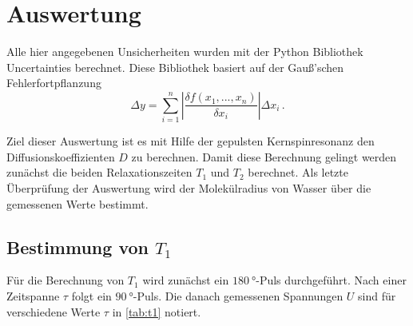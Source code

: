 \section{Auswertung}
\label{sec:Auswertung}

Alle hier angegebenen Unsicherheiten wurden mit der Python Bibliothek Uncertainties berechnet.\cite{uncertainties}
Diese Bibliothek basiert auf der Gauß'schen Fehlerfortpflanzung
\begin{equation}
    \Delta y = \sum_{i=1}^n \left| \frac{\delta f(x_1,...,x_n)}{\delta x_i} \right| \Delta x_i \, .
    \label{eq:fehlerrechnung}
\end{equation}

Ziel dieser Auswertung ist es mit Hilfe der gepulsten Kernspinresonanz den Diffusionskoeffizienten $D$ zu berechnen. 
Damit diese Berechnung gelingt werden zunächst die beiden Relaxationszeiten $T_1$ und $T_2$ berechnet.
Als letzte Überprüfung der Auswertung wird der Molekülradius von Wasser über die gemessenen Werte bestimmt.

\subsection{Bestimmung von $T_1$}
\label{ssec:aus1}

Für die Berechnung von $T_1$ wird zunächst ein $\SI{180}{\degree}$-Puls durchgeführt.
Nach einer Zeitspanne $\tau$ folgt ein $\SI{90}{\degree}$-Puls. 
Die danach gemessenen Spannungen $U$ sind für verschiedene Werte $\tau$ in \autoref{tab:t1} notiert. 

